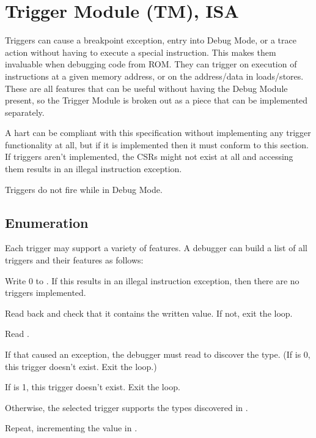 \chapter{Trigger Module (TM), ISA}
\label{sec:trigger}

Triggers can cause a breakpoint exception, entry into Debug Mode, or a trace action
without having to execute a special instruction. This makes them invaluable
when debugging code from ROM. They can trigger on execution of instructions at
a given memory address, or on the address/data in loads/stores.  These are all
features that can be useful without having the Debug Module present, so the
Trigger Module is broken out as a piece that can be implemented separately.

A hart can be compliant with this specification without implementing any
trigger functionality at all, but if it is implemented then it must conform to
this section. If triggers aren't implemented, the CSRs might not exist at all and
accessing them results in an illegal instruction exception.

Triggers do not fire while in Debug Mode.

\section{Enumeration}

\begin{steps}{Each trigger may support a variety of features. A debugger can
    build a list of all triggers and their features as follows:}
\item Write 0 to \RcsrTselect. If this results in an illegal instruction
    exception, then there are no triggers implemented.
\item Read back \RcsrTselect and check that it contains the written value. If not,
    exit the loop.
\item Read \RcsrTinfo.
\item If that caused an exception, the debugger must read \RcsrTdataOne to
    discover the type. (If \FcsrTdataOneType is 0, this trigger doesn't exist. Exit the
    loop.)
\item If \FcsrTinfoInfo is 1, this trigger doesn't exist. Exit the loop.
\item Otherwise, the selected trigger supports the types discovered in \FcsrTinfoInfo.
\item Repeat, incrementing the value in \RcsrTselect.
\end{steps}

